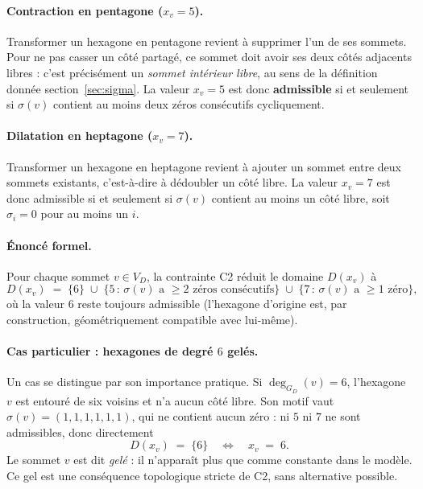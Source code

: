 \documentclass[11pt,a4paper]{article}
\newcommand{\GD}{\ensuremath{G_D}}                 %
\begin{document}
\paragraph{Contraction en pentagone ($x_v = 5$).}
Transformer un hexagone en pentagone revient à supprimer l'un de ses
sommets. Pour ne pas casser un côté partagé, ce sommet doit avoir ses
deux côtés adjacents libres : c'est précisément un \emph{sommet
intérieur libre}, au sens de la définition donnée
section~\ref{sec:sigma}. La valeur $x_v = 5$ est donc \textbf{admissible}
si et seulement si $\sigma(v)$ contient au moins deux zéros consécutifs
cycliquement.

\paragraph{Dilatation en heptagone ($x_v = 7$).}
Transformer un hexagone en heptagone revient à ajouter un sommet entre
deux sommets existants, c'est-à-dire à dédoubler un côté libre. La
valeur $x_v = 7$ est donc admissible si et seulement si $\sigma(v)$
contient au moins un côté libre, soit $\sigma_i = 0$ pour au moins
un $i$.

\paragraph{Énoncé formel.}
Pour chaque sommet $v \in V_D$, la contrainte C2 réduit le domaine
$D(x_v)$ à
\[
  D(x_v) \;=\; \{6\}
              \;\cup\; \bigl\{5 \,:\, \sigma(v) \text{ a } \ge 2 \text{ zéros consécutifs}\bigr\}
              \;\cup\; \bigl\{7 \,:\, \sigma(v) \text{ a } \ge 1 \text{ zéro}\bigr\} ,
\]
où la valeur $6$ reste toujours admissible (l'hexagone d'origine est, par
construction, géométriquement compatible avec lui-même).

\paragraph{Cas particulier : hexagones de degré $6$ gelés.}
Un cas se distingue par son importance pratique. Si $\deg_{\GD}(v) = 6$,
l'hexagone $v$ est entouré de six voisins et n'a aucun côté libre. Son
motif vaut $\sigma(v) = (1,1,1,1,1,1)$, qui ne contient aucun zéro : ni
$5$ ni $7$ ne sont admissibles, donc directement
\[
  D(x_v) \;=\; \{6\} \quad\Longleftrightarrow\quad x_v \;=\; 6 .
\]
Le sommet $v$ est dit \emph{gelé} : il n'apparaît plus que comme
constante dans le modèle. Ce gel est une conséquence topologique
stricte de C2, sans alternative possible.
\end{document}
